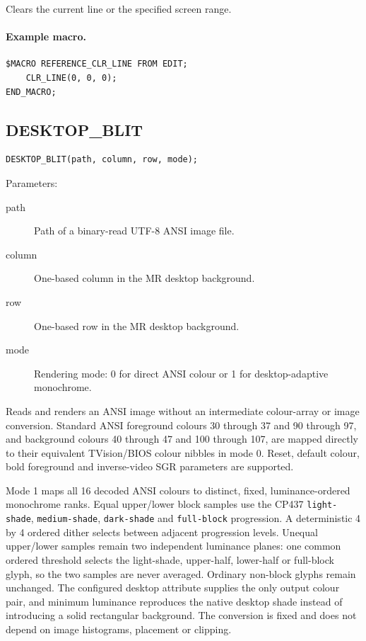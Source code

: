 \documentclass[a4paper,10pt,twoside,openany]{book}
\newenvironment{mrmacextension}{\begin{changebar}}{\end{changebar}}
\begin{document}
Clears the current line or the specified screen range.

\paragraph{Example macro.}
\begin{verbatim}
$MACRO REFERENCE_CLR_LINE FROM EDIT;
    CLR_LINE(0, 0, 0);
END_MACRO;
\end{verbatim}

\Needspace{0.86\textheight}%
\begin{mrmacextension}
\label{prim:procedure-desktop-blit}
\subsection*{DESKTOP\_BLIT}
\begin{verbatim}
DESKTOP_BLIT(path, column, row, mode);
\end{verbatim}
Parameters:
\begin{description}
\item[path] Path of a binary-read UTF-8 ANSI image file.
\item[column] One-based column in the MR desktop background.
\item[row] One-based row in the MR desktop background.
\item[mode] Rendering mode: 0 for direct ANSI colour or 1 for desktop-adaptive
monochrome.
\end{description}

Reads and renders an ANSI image without an intermediate colour-array or image
conversion. Standard ANSI foreground colours 30 through 37 and 90 through 97,
and background colours 40 through 47 and 100 through 107, are mapped directly
to their equivalent TVision/BIOS colour nibbles in mode 0. Reset, default
colour, bold foreground and inverse-video SGR parameters are supported.

Mode 1 maps all 16 decoded ANSI colours to distinct, fixed,
luminance-ordered monochrome ranks. Equal upper/lower block samples use the
CP437 \texttt{light-shade}, \texttt{medium-shade}, \texttt{dark-shade} and
\texttt{full-block} progression. A deterministic 4 by 4 ordered dither selects
between adjacent progression levels. Unequal upper/lower samples remain two
independent luminance planes: one common ordered threshold selects the
light-shade, upper-half, lower-half or full-block glyph, so the two samples are
never averaged. Ordinary non-block glyphs remain unchanged. The configured
desktop attribute supplies the only output colour pair, and minimum luminance
reproduces the native desktop shade instead of introducing a solid rectangular
background. The conversion is fixed and does not depend on image histograms,
placement or clipping.


\end{mrmacextension}
\end{document}

